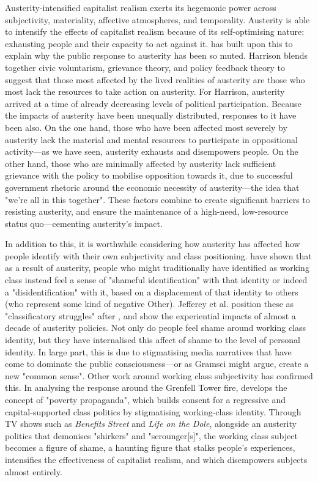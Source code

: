 Austerity-intensified capitalist realism exerts its hegemonic power across subjectivity, materiality, affective atmospheres, and temporality. Austerity is able to intensify the effects of capitalist realism because of its self-optimising nature: exhausting people and their capacity to act against it. \citet{harrison_cant_2020} has built upon this to explain why the public response to austerity has been so muted. Harrison blends together civic voluntarism, grievance theory, and policy feedback theory to suggest that those most affected by the lived realities of austerity are those who most lack the resources to take action on austerity. For Harrison, austerity arrived at a time of already decreasing levels of political participation. Because the impacts of austerity have been unequally distributed, responses to it have been also. On the one hand, those who have been affected most severely by austerity lack the material and mental resources to participate in oppositional activity—as we have seen, austerity exhausts and disempowers people. On the other hand, those who are minimally affected by austerity lack sufficient grievance with the policy to mobilise opposition towards it, due to successful government rhetoric around the economic necessity of austerity—the idea that "we're all in this together". These factors combine to create significant barriers to resisting austerity, and ensure the maintenance of a high-need, low-resource status quo—cementing austerity's impact.

In addition to this, it is worthwhile considering how austerity has affected how people identify with their own subjectivity and class positioning. \citet[p. 128]{jeffery_classificatory_2019}  have shown that as a result of austerity, people who might traditionally have identified as working class instead feel a sense of "shameful identification" with that identity or indeed a "disidentification" with it, based on a displacement of that identity to others (who represent some kind of negative Other). Jefferey et al. position these as "classificatory struggles" after \citet{tyler_classificatory_2015}, and show the experiential impacts of almost a decade of austerity policies. Not only do people feel shame around working class identity, but they have internalised this affect of shame to the level of personal identity. In large part, this is due to stigmatising media narratives that have come to dominate the public consciousness—or as Gramsci might argue, create a new "common sense". Other work around working class subjectivity has confirmed this. In analysing the response around the Grenfell Tower fire, \citet[p. 783]{shildrick_lessons_2018} develops the concept of "poverty propaganda", which builds consent for a regressive and capital-supported class politics by stigmatising working-class identity. Through TV shows such as \emph{Benefits Street} and \emph{Life on the Dole}, alongside an austerity politics that demonises "shirkers" and "scrounger[s]", the working class subject becomes a figure of shame, a haunting figure that stalks people's experiences, intensifies the effectiveness of capitalist realism, and which disempowers subjects almost entirely.

